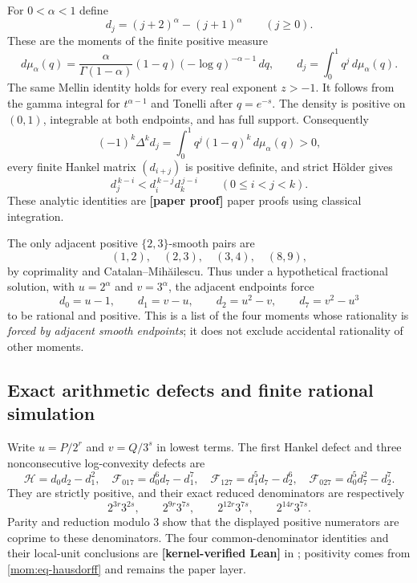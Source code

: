 \documentclass[11pt,oneside]{article}
\theoremstyle{definition}
\theoremstyle{remark}
\newcommand{\lean}[1]{\texttt{\detokenize{#1}}}
\newcommand{\statuslean}{\textcolor{leanblue}{\textbf{[kernel-verified Lean]}}}
\newcommand{\statusnew}{\textcolor{newgreen}{\textbf{[paper proof]}}}
\begin{document}
For $0<\alpha<1$ define
\[
 d_j=(j+2)^\alpha-(j+1)^\alpha\qquad(j\ge0).
\]
These are the moments of the finite positive measure
\begin{equation}
 d\mu_\alpha(q)=\frac{\alpha}{\Gamma(1-\alpha)}
 (1-q)(-\log q)^{-\alpha-1}\,dq,
 \qquad
 d_j=\int_0^1q^j\,d\mu_\alpha(q).
 \label{mom:eq-hausdorff}
\end{equation}
The same Mellin identity holds for every real exponent $z>-1$.  It follows from the gamma
integral for $t^{\alpha-1}$ and Tonelli after $q=e^{-s}$.  The density is positive on
$(0,1)$, integrable at both endpoints, and has full support.  Consequently
\begin{equation}
 (-1)^k\Delta^kd_j=\int_0^1q^j(1-q)^k\,d\mu_\alpha(q)>0,
 \label{mom:eq-complete-monotone}
\end{equation}
every finite Hankel matrix $(d_{i+j})$ is positive definite, and strict H\"older gives
\[
 d_j^{\,k-i}<d_i^{\,k-j}d_k^{\,j-i}\qquad(0\le i<j<k).
\]
These analytic identities are \statusnew{} paper proofs using classical integration.

The only adjacent positive $\{2,3\}$-smooth pairs are
\[
 (1,2),\quad(2,3),\quad(3,4),\quad(8,9),
\]
by coprimality and Catalan--Mih\u{a}ilescu.  Thus under a hypothetical fractional solution,
with $u=2^\alpha$ and $v=3^\alpha$, the adjacent endpoints force
\begin{equation}
 d_0=u-1,\qquad d_1=v-u,\qquad d_2=u^2-v,\qquad d_7=v^2-u^3
 \label{mom:eq-forced-moments}
\end{equation}
to be rational and positive.  This is a list of the four moments whose rationality is
\emph{forced by adjacent smooth endpoints}; it does not exclude accidental rationality of
other moments.

\subsection{Exact arithmetic defects and finite rational simulation}
\label{mom:defects}

Write $u=P/2^r$ and $v=Q/3^s$ in lowest terms.  The first Hankel defect and three
nonconsecutive log-convexity defects are
\[
 \mathcal H=d_0d_2-d_1^2,\quad
 \mathcal F_{017}=d_0^6d_7-d_1^7,\quad
 \mathcal F_{127}=d_1^5d_7-d_2^6,\quad
 \mathcal F_{027}=d_0^5d_7^2-d_2^7.
\]
They are strictly positive, and their exact reduced denominators are respectively
\begin{equation}
 2^{3r}3^{2s},\qquad 2^{9r}3^{7s},\qquad
 2^{12r}3^{7s},\qquad 2^{14r}3^{7s}.
 \label{mom:eq-defect-denominators}
\end{equation}
Parity and reduction modulo $3$ show that the displayed positive numerators are coprime to
these denominators.  The four common-denominator identities and their local-unit conclusions
are \statuslean{} in \lean{MomentArithmetic}; positivity comes from
\eqref{mom:eq-hausdorff} and remains the paper layer.
\end{document}
